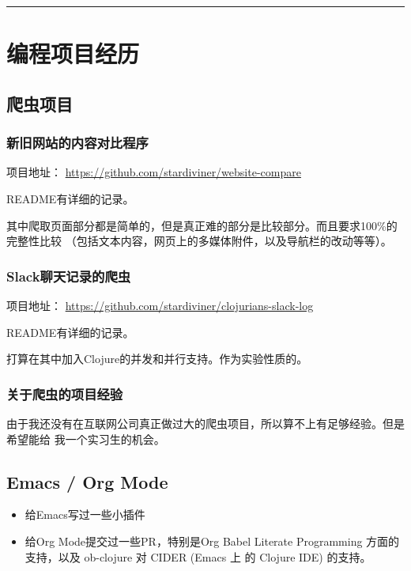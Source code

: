 \documentclass[11pt]{article}
\begin{document}
\noindent\rule{\textwidth}{0.8pt}

\section{编程项目经历}
\label{sec:org162a77b}

\subsection{爬虫项目}
\label{sec:org3b64410}

\subsubsection{新旧网站的内容对比程序}
\label{sec:org037040c}
项目地址： \url{https://github.com/stardiviner/website-compare}

README有详细的记录。

其中爬取页面部分都是简单的，但是真正难的部分是比较部分。而且要求100\%的完整性比较
（包括文本内容，网页上的多媒体附件，以及导航栏的改动等等）。

\subsubsection{Slack聊天记录的爬虫}
\label{sec:org8569a54}
项目地址： \url{https://github.com/stardiviner/clojurians-slack-log}

README有详细的记录。

打算在其中加入Clojure的并发和并行支持。作为实验性质的。

\subsubsection{关于爬虫的项目经验}
\label{sec:orgafe34dc}

由于我还没有在互联网公司真正做过大的爬虫项目，所以算不上有足够经验。但是希望能给
我一个实习生的机会。

\subsection{Emacs / Org Mode}
\label{sec:org463a336}

\begin{itemize}
\item 给Emacs写过一些小插件
\item 给Org Mode提交过一些PR，特别是Org Babel Literate Programming 方面的支持，以及
ob-clojure 对 CIDER (Emacs 上 的 Clojure IDE) 的支持。
\end{itemize}
\end{document}
